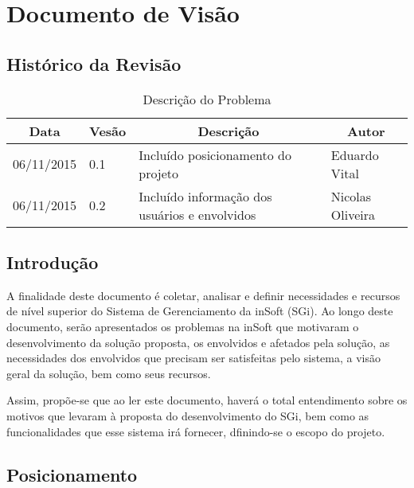 \chapter{Documento de Visão}

  \section{Histórico da Revisão}

  \begin{table}[H]
    \centering
    \begin{tabular}{|l|l|l|l|}
      \hline
      \multicolumn{1}{|c|}{Data} & \multicolumn{1}{c|}{Vesão} & \multicolumn{1}{c|}{Descrição}     & \multicolumn{1}{c|}{Autor} \\ \hline
      06/11/2015                & 0.1                         & Incluído posicionamento do projeto & Eduardo Vital       \\ \hline
      06/11/2015                & 0.2                         & Incluído informação dos usuários e envolvidos & Nicolas  Oliveira
        \\ \hline
    \end{tabular}
    \caption{Descrição do Problema}
  \end{table}

  \section{Introdução}

    A finalidade deste documento é coletar, analisar e definir necessidades e recursos de nível superior do Sistema de Gerenciamento da inSoft (SGi). Ao longo deste documento, serão apresentados os problemas na inSoft que motivaram o desenvolvimento da solução proposta, os envolvidos e afetados pela solução, as necessidades dos envolvidos que precisam ser satisfeitas pelo sistema, a visão geral da solução, bem como seus recursos.

    Assim, propõe-se que ao ler este documento, haverá o total entendimento sobre os motivos que levaram à proposta do desenvolvimento do SGi, bem como as funcionalidades que esse sistema irá fornecer, dfinindo-se o escopo do projeto.


  \section{Posicionamento}
